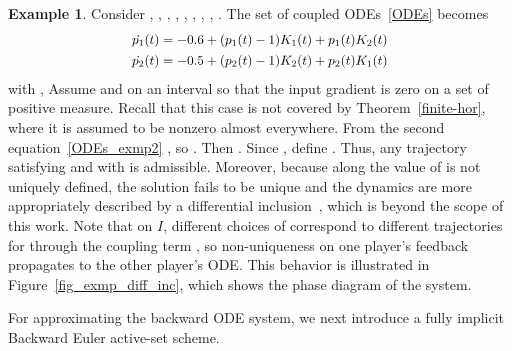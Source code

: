 \documentclass[letterpaper, 10 pt, conference]{ieeeconf}
\theoremstyle{definition}
\newtheorem{exmp}{Example}
\begin{document}
\begin{exmp}\label{exmp_filippov}
     Consider , , , , , , , , . The set of coupled ODEs~\eqref{ODEs} becomes
\begin{align}\label{ODEs_exmp}
    \scalebox{.94}{$\dot {p_1}(t)=-0.6+(p_1(t)-1)K_1(t)+p_1(t)K_2(t)$}\\
    \scalebox{.94}{$\dot{p_2}(t)=-0.5+(p_2(t)-1)K_2(t)+p_2(t)K_1(t)$}
    \label{ODEs_exmp2}
\end{align}
with ,  Assume  and  on an interval  so that the input gradient is zero on a set of positive measure. 
Recall that this case is not covered by Theorem~\ref{finite-hor}, where it is assumed to be nonzero almost everywhere. From the second equation~\eqref{ODEs_exmp2} , so . Then . Since , define . Thus, any trajectory satisfying  and  with  is admissible. Moreover, because along  the value of  is not uniquely defined, the solution fails to be unique and the dynamics are more appropriately described by a differential inclusion~\cite{Cortes, vinter_siam}, which is beyond the scope of this work. Note that on $I$, different choices of  correspond to different trajectories for  through the coupling term , so non-uniqueness on one player's feedback propagates to the other player's ODE. This behavior is illustrated in Figure~\ref{fig_exmp_diff_inc}, which shows the phase diagram of the system.
\end{exmp}
For approximating the backward ODE system, we next introduce a fully implicit Backward Euler active-set scheme. 
\end{document}
